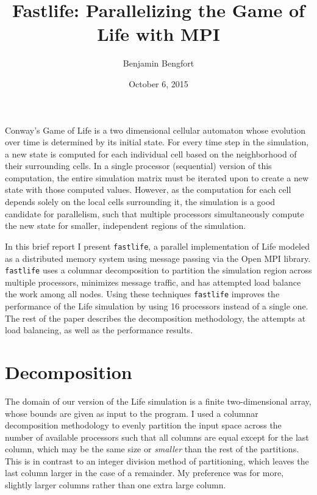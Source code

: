 \documentclass[11pt,letterpaper]{article}
\begin{document}
\title{Fastlife: Parallelizing the Game of Life with MPI}
\author[ ]{Benjamin Bengfort}

\date{October 6, 2015}

\maketitle

Conway's Game of Life is a two dimensional cellular automaton whose evolution over time is determined by its initial state. For every time step in the simulation, a new state is computed for each individual cell based on the neighborhood of their surrounding cells. In a single processor (sequential) version of this computation, the entire simulation matrix must be iterated upon to create a new state with those computed values. However, as the computation for each cell depends solely on the local cells surrounding it, the simulation is a good candidate for parallelism, such that multiple processors simultaneously compute the new state for smaller, independent regions of the simulation.

In this brief report I present \texttt{fastlife}, a parallel implementation of Life modeled as a distributed memory system using message passing via the Open MPI library. \texttt{fastlife} uses a columnar decomposition to partition the simulation region across multiple processors, minimizes message traffic, and has attempted load balance the work among all nodes. Using these techniques \texttt{fastlife} improves the performance of the Life simulation by using 16 processors instead of a single one. The rest of the paper describes the decomposition methodology, the attempts at load balancing, as well as the performance results.

\section*{Decomposition}

The domain of our version of the Life simulation is a finite two-dimensional array, whose bounds are given as input to the program. I used a columnar decomposition methodology to evenly partition the input space across the number of available processors such that all columns are equal except for the last column, which may be the same size or \textit{smaller} than the rest of the partitions. This is in contrast to an integer division method of partitioning, which leaves the last column larger in the case of a remainder. My preference was for more, slightly larger columns rather than one extra large column.
\end{document}
